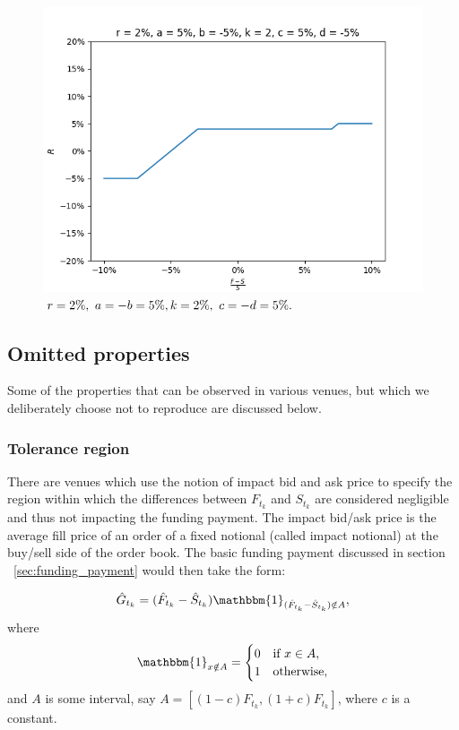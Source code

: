\documentclass[10pt]{article}
\begin{document}
\begin{figure}[!htb]
  \includegraphics[width=\linewidth]{./plots/r_0.02_a_0.05_b_-0.05_c_0.05_d_-0.05_k_2.png}
  \caption{$\\r=2\%,\ a=-b=5\%,\\ k=2\%,\ c=-d=5\%.$}\label{fig:clamp3}
\endminipage
\end{figure}

\subsection{Omitted properties}
Some of the properties that can be observed in various venues, but which we deliberately choose not to reproduce are discussed below.

\subsubsection{Tolerance region}

There are venues which use the notion of impact bid and ask price to specify the region within which the differences between $F_{t_k}$ and $S_{t_k}$ are considered negligible and thus not impacting the funding payment. The impact bid/ask price is the average fill price of an order of a fixed notional (called impact notional) at the buy/sell side of the order book. The basic funding payment discussed in section ~\ref{sec:funding_payment} would then take the form:

$$
 \hat G_{t_k} = (\hat F_{t_k} - \hat S_{t_k})\mathbbm{1}_{ (\hat F_{t_k} - \hat S_{t_k}) \notin A },
$$
where
$$
\mathbbm{1}_{ x \notin A } = \begin{cases}
    0 & \text{if } x \in A,\\
    1              & \text{otherwise,}
\end{cases}
$$ 
and $A$ is some interval, say $A=[(1-c)F_{t_k},(1+c)F_{t_k}]$, where $c$ is a constant.
\end{document}
